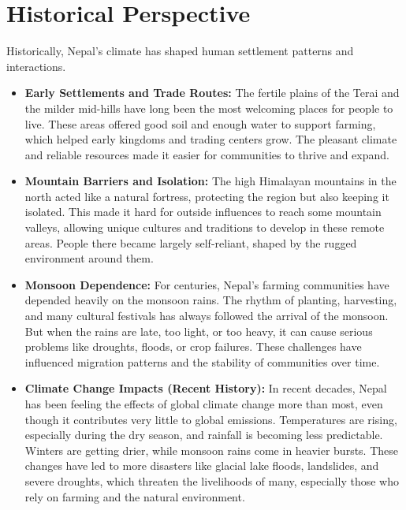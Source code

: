 \section*{Historical Perspective}

Historically, Nepal's climate has shaped human settlement patterns and interactions.

\begin{itemize}
  \item \textbf{Early Settlements and Trade Routes:} The fertile plains of the Terai and the milder mid-hills have long been the most welcoming places for people to live. These areas offered good soil and enough water to support farming, which helped early kingdoms and trading centers grow. The pleasant climate and reliable resources made it easier for communities to thrive and expand.

  \item \textbf{Mountain Barriers and Isolation:} The high Himalayan mountains in the north acted like a natural fortress, protecting the region but also keeping it isolated. This made it hard for outside influences to reach some mountain valleys, allowing unique cultures and traditions to develop in these remote areas. People there became largely self-reliant, shaped by the rugged environment around them.
  
  \item \textbf{Monsoon Dependence:}  For centuries, Nepal’s farming communities have depended heavily on the monsoon rains. The rhythm of planting, harvesting, and many cultural festivals has always followed the arrival of the monsoon. But when the rains are late, too light, or too heavy, it can cause serious problems like droughts, floods, or crop failures. These challenges have influenced migration patterns and the stability of communities over time.

  \item \textbf{Climate Change Impacts (Recent History):}  In recent decades, Nepal has been feeling the effects of global climate change more than most, even though it contributes very little to global emissions. Temperatures are rising, especially during the dry season, and rainfall is becoming less predictable. Winters are getting drier, while monsoon rains come in heavier bursts. These changes have led to more disasters like glacial lake floods, landslides, and severe droughts, which threaten the livelihoods of many, especially those who rely on farming and the natural environment.

\end{itemize}

